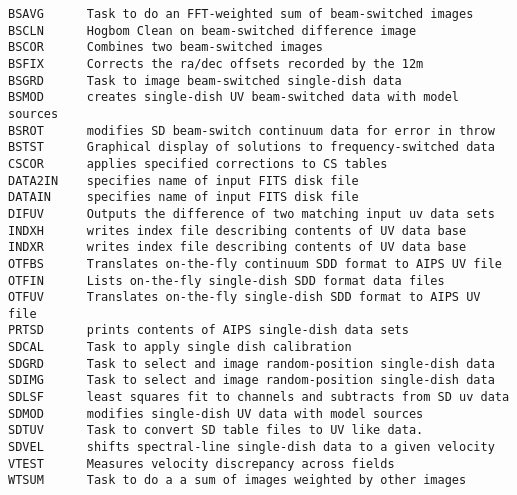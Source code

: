 \vskip 0.5pt
\bbve\begin{verbatim}
BSAVG      Task to do an FFT-weighted sum of beam-switched images
BSCLN      Hogbom Clean on beam-switched difference image
BSCOR      Combines two beam-switched images
BSFIX      Corrects the ra/dec offsets recorded by the 12m
BSGRD      Task to image beam-switched single-dish data
BSMOD      creates single-dish UV beam-switched data with model sources
BSROT      modifies SD beam-switch continuum data for error in throw
BSTST      Graphical display of solutions to frequency-switched data
CSCOR      applies specified corrections to CS tables
DATA2IN    specifies name of input FITS disk file
DATAIN     specifies name of input FITS disk file
DIFUV      Outputs the difference of two matching input uv data sets
INDXH      writes index file describing contents of UV data base
INDXR      writes index file describing contents of UV data base
OTFBS      Translates on-the-fly continuum SDD format to AIPS UV file
OTFIN      Lists on-the-fly single-dish SDD format data files
OTFUV      Translates on-the-fly single-dish SDD format to AIPS UV file
PRTSD      prints contents of AIPS single-dish data sets
SDCAL      Task to apply single dish calibration
SDGRD      Task to select and image random-position single-dish data
SDIMG      Task to select and image random-position single-dish data
SDLSF      least squares fit to channels and subtracts from SD uv data
SDMOD      modifies single-dish UV data with model sources
SDTUV      Task to convert SD table files to UV like data.
SDVEL      shifts spectral-line single-dish data to a given velocity
VTEST      Measures velocity discrepancy across fields
WTSUM      Task to do a a sum of images weighted by other images
\end{verbatim}\eve

\vfill\eject
{}

